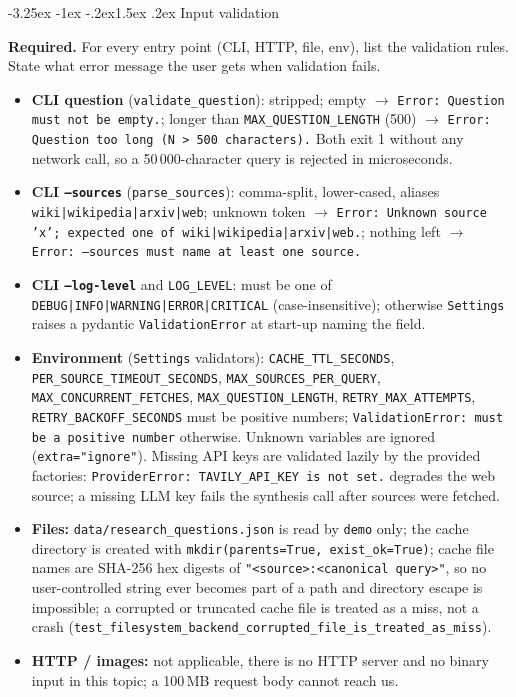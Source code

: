 \documentclass[11pt,a4paper]{article}
\makeatletter
\renewcommand\subsection{\@startsection{subsection}{2}{\z@}%
    {-3.25ex \@plus -1ex \@minus -.2ex}{1.5ex \@plus .2ex}%
    {\normalfont\large\bfseries\color{accent}}}%
\makeatother
\begin{document}
\subsection{Input validation}

\begin{deliverbox}
\textbf{Required.} For every entry point (CLI, HTTP, file, env), list the validation rules. State what error message the user gets when validation fails.
\end{deliverbox}

\begin{itemize}[leftmargin=1.4em,itemsep=2pt]
  \item \textbf{CLI question} (\texttt{validate\_question}): stripped; empty $\to$ \texttt{Error: Question must not be empty.}; longer than \texttt{MAX\_QUESTION\_LENGTH} (500) $\to$ \texttt{Error: Question too long (N > 500 characters).} Both exit 1 without any network call, so a 50\,000-character query is rejected in microseconds.
  \item \textbf{CLI \texttt{--sources}} (\texttt{parse\_sources}): comma-split, lower-cased, aliases \texttt{wiki|wikipedia|arxiv|web}; unknown token $\to$ \texttt{Error: Unknown source 'x'; expected one of wiki|wikipedia|arxiv|web.}; nothing left $\to$ \texttt{Error: --sources must name at least one source.}
  \item \textbf{CLI \texttt{--log-level}} and \texttt{LOG\_LEVEL}: must be one of \texttt{DEBUG|INFO|WARNING|ERROR|CRITICAL} (case-insensitive); otherwise \texttt{Settings} raises a pydantic \texttt{ValidationError} at start-up naming the field.
  \item \textbf{Environment} (\texttt{Settings} validators): \texttt{CACHE\_TTL\_SECONDS}, \texttt{PER\_SOURCE\_TIMEOUT\_SECONDS}, \texttt{MAX\_SOURCES\_PER\_QUERY}, \texttt{MAX\_CONCURRENT\_FETCHES}, \texttt{MAX\_QUESTION\_LENGTH}, \texttt{RETRY\_MAX\_ATTEMPTS}, \texttt{RETRY\_BACKOFF\_SECONDS} must be positive numbers; \texttt{ValidationError: must be a positive number} otherwise. Unknown variables are ignored (\texttt{extra="ignore"}). Missing API keys are validated lazily by the provided factories: \texttt{ProviderError: TAVILY\_API\_KEY is not set.} degrades the web source; a missing LLM key fails the synthesis call after sources were fetched.
  \item \textbf{Files:} \texttt{data/research\_questions.json} is read by \texttt{demo} only; the cache directory is created with \texttt{mkdir(parents=True, exist\_ok=True)}; cache file names are SHA-256 hex digests of \texttt{"<source>:<canonical query>"}, so no user-controlled string ever becomes part of a path and directory escape is impossible; a corrupted or truncated cache file is treated as a miss, not a crash (\texttt{test\_filesystem\_backend\_corrupted\_file\_is\_treated\_as\_miss}).
  \item \textbf{HTTP / images:} not applicable, there is no HTTP server and no binary input in this topic; a 100\,MB request body cannot reach us.
\end{itemize}
\end{document}
